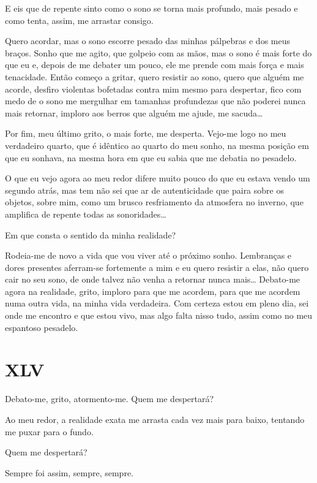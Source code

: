 E eis que de repente sinto como o sono se torna mais profundo, mais pesado e como tenta, assim, me arrastar consigo.

Quero acordar, mas o sono escorre pesado das minhas pálpebras e dos meus braços. Sonho que me agito, que golpeio com as mãos, mas o sono é mais forte do que eu e, depois de me debater um pouco, ele me prende com mais força e mais tenacidade. Então começo a gritar, quero resistir ao sono, quero que alguém me acorde, desfiro violentas bofetadas contra mim mesmo para despertar, fico com medo de o sono me mergulhar em tamanhas profundezas que não poderei nunca mais retornar, imploro aos berros que alguém me ajude, me sacuda\dots

Por fim, meu último grito, o mais forte, me desperta. Vejo-me logo no meu verdadeiro quarto, que é idêntico ao quarto do meu sonho, na mesma posição em que eu sonhava, na mesma hora em que eu sabia que me debatia no pesadelo.

O que eu vejo agora ao meu redor difere muito pouco do que eu estava vendo um segundo atrás, mas tem não sei que ar de autenticidade que paira sobre os objetos, sobre mim, como um brusco resfriamento da atmosfera no inverno, que amplifica de repente todas as sonoridades\dots

Em que consta o sentido da minha realidade?

Rodeia-me de novo a vida que vou viver até o próximo sonho. Lembranças e dores presentes aferram-se fortemente a mim e eu quero resistir a elas, não quero cair no seu sono, de onde talvez não venha a retornar nunca mais\dots
Debato-me agora na realidade, grito, imploro para que me acordem, para que me acordem numa outra vida, na minha vida verdadeira. Com certeza estou em pleno dia, sei onde me encontro e que estou vivo, mas algo falta nisso tudo, assim como no meu espantoso pesadelo.


\chapter*{\centering\Large{XLV}}

Debato-me, grito, atormento-me. Quem me despertará?

Ao meu redor, a realidade exata me arrasta cada vez mais para baixo, tentando me puxar para o fundo.

Quem me despertará?

Sempre foi assim, sempre, sempre.
